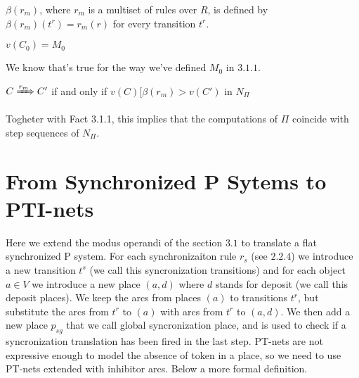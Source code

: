 \begin{definition}
$\beta(r_m)$, where $r_m$ is a multiset of rules over $R$, is defined by 
$\beta(r_m)(t^r)=r_m(r)$ for every transition $t^r$.  
\end{definition}

\begin{fact}[]
$v(C_0)=M_0$
\end{fact}
We know that's true for the way we've defined $M_0$ in \hyperref[def:def_tr_basic]{$3.1.1$}.

\begin{fact}[]
$C \xRightarrow{r_m} C'$ if and only if $v(C)[\beta(r_m)> v(C')$ in $N_\Pi$
\end{fact}

Togheter with Fact 3.1.1, this implies that the computations of $\Pi$ coincide with step sequences of $N_\Pi$. 

\section{From Synchronized P Sytems to PTI-nets}

Here we extend the modus operandi of the section \hyperref[sec:basic_p_to_pt]{$3.1$} to translate 
a flat synchronized P system.
For each synchronizaiton rule $r_s$ (see \hyperref[def:sync_rule]{$2.2.4$}) we introduce a new transition $t^s$ (we call this syncronization transitions) and for each object $a \in V$ we introduce a new place $(a,d)$ where $d$ stands for deposit (we call this deposit places).
We keep the arcs from places $(a)$ to transitions $t^r$, but substitute the arcs from $t^r$ to $(a)$ with arcs from $t^r$ to $(a,d)$.
We then add a new place $p_{sg}$ that we call global syncronization place, and is used to check if a syncronization translation has been fired in the last step.
PT-nets are not expressive enough to model the absence of token in a place, so we need to use PT-nets extended with inhibitor arcs.
Below a more formal definition.

